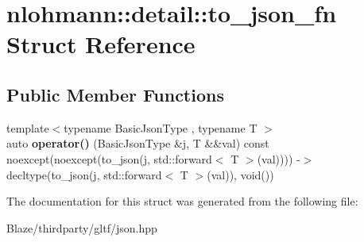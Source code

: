 \hypertarget{structnlohmann_1_1detail_1_1to__json__fn}{}\section{nlohmann\+:\+:detail\+:\+:to\+\_\+json\+\_\+fn Struct Reference}
\label{structnlohmann_1_1detail_1_1to__json__fn}
\subsection*{Public Member Functions}
\begin{DoxyCompactItemize}
\item 
\mbox{\label{structnlohmann_1_1detail_1_1to__json__fn_aecfb5114c8a737fc89d98589482795b8}} 
{\footnotesize template$<$typename Basic\+Json\+Type , typename T $>$ }\\auto {\bfseries operator()} (Basic\+Json\+Type \&j, T \&\&val) const noexcept(noexcept(to\+\_\+json(j, std\+::forward$<$ T $>$(val)))) -\/$>$ decltype(to\+\_\+json(j, std\+::forward$<$ T $>$(val)), void())
\end{DoxyCompactItemize}


The documentation for this struct was generated from the following file\+:\begin{DoxyCompactItemize}
\item 
Blaze/thirdparty/gltf/json.\+hpp\end{DoxyCompactItemize}
